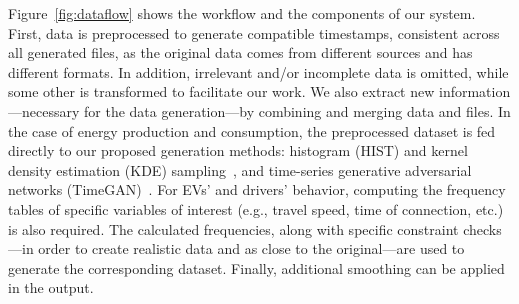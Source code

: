 \documentclass[sigconf]{acmart}
\begin{document}
Figure~\ref{fig:dataflow} shows the workflow and the components of our system. First, data is preprocessed to generate compatible timestamps, consistent across all generated files, as the original data comes from different sources and has different formats. In addition, irrelevant and/or incomplete data is omitted, while some other is transformed to facilitate our work. We also extract new information---necessary for the data generation---by combining and merging data and files. 
In the case of energy production and consumption, the preprocessed dataset is fed directly to our proposed generation methods: histogram (HIST) and kernel density estimation (KDE) sampling~\cite{hardle2004nonparametric}, and time-series generative adversarial networks (TimeGAN)~\cite{zhang2018generative}. 
For EVs' and drivers' behavior, computing the frequency tables of specific variables of interest (e.g., travel speed, time of connection, etc.) is also required. The calculated frequencies, along with specific constraint checks---in order to create realistic data and as close to the original---are used to generate the corresponding dataset. Finally, additional smoothing can be applied in the output.
\end{document}
